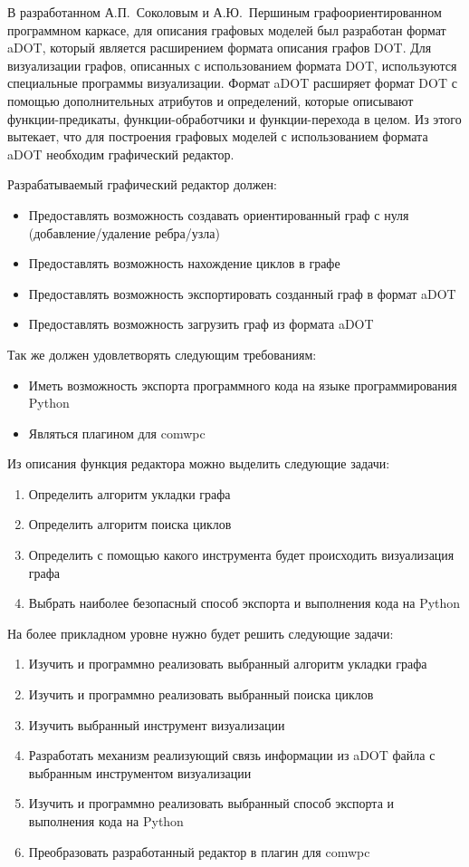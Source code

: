 \def\notedate{2022.12.23}
\def\currentauthor{Журавлев Н.В. (РК6-72Б)}

В разработанном А.П.~Соколовым и А.Ю.~Першиным графоориентированном программном каркасе, для описания графовых моделей был разработан формат aDOT, который является расширением формата описания графов DOT.
Для визуализации графов, описанных с использованием формата DOT, используются специальные программы визуализации. Формат aDOT расширяет формат DOT с помощью дополнительных атрибутов и определений, которые описывают функции-предикаты, функции-обработчики и функции-перехода в целом.
Из этого вытекает, что для построения графовых моделей с использованием формата aDOT необходим графический редактор.

Разрабатываемый графический редактор должен:
\begin{itemize}
\item  Предоставлять возможность создавать ориентированный граф с нуля (добавление/удаление ребра/узла)
\item Предоставлять возможность нахождение циклов в графе
\item Предоставлять возможность экспортировать созданный граф в формат aDOT
\item Предоставлять возможность загрузить граф из формата aDOT
\end{itemize}

Так же должен удовлетворять следующим требованиям:
\begin{itemize}
\item Иметь возможность экспорта программного кода на языке программирования Python
\item Являться плагином для comwpc
\end{itemize}

Из описания функция редактора можно выделить следующие задачи:
\begin{enumerate}
\item Определить алгоритм укладки графа
\item Определить алгоритм поиска циклов
\item Определить с помощью какого инструмента будет происходить визуализация графа
\item Выбрать наиболее безопасный способ экспорта и выполнения кода на Python
\end{enumerate}

На более прикладном уровне нужно будет решить следующие задачи:
\begin{enumerate}
\item Изучить и программно реализовать выбранный алгоритм укладки графа
\item Изучить и программно реализовать выбранный поиска циклов
\item Изучить выбранный инструмент визуализации
\item Разработать механизм реализующий связь информации из aDOT файла с выбранным инструментом визуализации
\item Изучить и программно реализовать выбранный способ экспорта и выполнения кода на Python
\item Преобразовать разработанный редактор в плагин для comwpc
\end{enumerate}
\noteattributes{} 